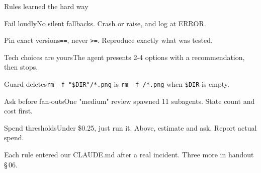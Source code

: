 \documentclass[aspectratio=169,11pt,t]{beamer}
\begin{document}
\begin{frame}{Rules learned the hard way}
  \begin{tcbraster}[raster columns=3, raster equal height, raster column skip=6pt, raster row skip=6pt]
    \begin{card}{Fail loudly}No silent fallbacks. Crash or raise, and log at ERROR.\end{card}
    \begin{card}{Pin exact versions}\texttt{==}, never \texttt{>=}. Reproduce exactly what was tested.\end{card}
    \begin{card}{Tech choices are yours}The agent presents 2-4 options with a recommendation, then stops.\end{card}
    \begin{card}{Guard deletes}\texttt{rm -f "\$DIR"/*.png} is \texttt{rm -f /*.png} when \texttt{\$DIR} is empty.\end{card}
    \begin{card}{Ask before fan-outs}One "medium" review spawned 11 subagents. State count and cost first.\end{card}
    \begin{card}{Spend thresholds}Under \$0.25, just run it. Above, estimate and ask. Report actual spend.\end{card}
  \end{tcbraster}\par\vspace{0.15em}
  {\footnotesize\color{muted}Each rule entered our CLAUDE.md after a real incident. Three more in handout \S\,06.}
\end{frame}
\end{document}
